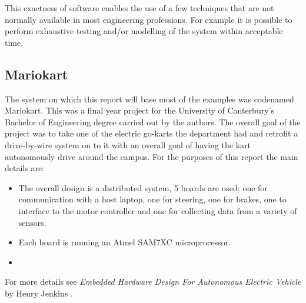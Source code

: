     This exactness of software enables the use of a few techniques that are not
    normally available in most engineering professions.  For example it is
    possible to perform exhaustive testing and/or modelling of the system within
    acceptable time.

  \subsection{Mariokart}

    The system on which this report will base most of the examples was codenamed
    Mariokart.  This was a final year project for the University of Canterbury's
    Bachelor of Engineering degree carried out by the authors.  The overall goal
    of the project was to take one of the electric go-karts the department had
    and retrofit a drive-by-wire system on to it with an overall goal of having
    the kart autonomously drive around the campus.  For the purposes of this
    report the main details are:

    \renewcommand{\labelitemi}{}
    \begin{itemize}
      \item 
        The overall design is a distributed system, 5 boards are used; one for
        communication with a host laptop, one for steering, one for brakes, one
        to interface to the motor controller and one for collecting data from a
        variety of sensors.

      \item
        Each board is running an Atmel SAM7XC microprocessor.

      \item
        
    \end{itemize}

    For more details see \emph{Embedded Hardware Design For Autonomous Electric
    Vehicle} by Henry Jenkins \cite{jenkins_2011}.
